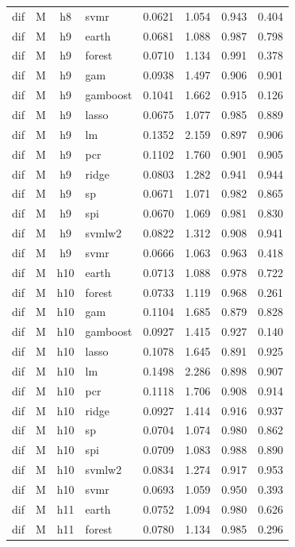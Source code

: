 \begin{ThreePartTable}
\begin{longtable}[t]{llclcccc}
dif & M & h8 & svmr & 0.0621 & 1.054 & 0.943 & 0.404\\
\addlinespace
dif & M & h9 & earth & 0.0681 & 1.088 & 0.987 & 0.798\\
dif & M & h9 & forest & 0.0710 & 1.134 & 0.991 & 0.378\\
dif & M & h9 & gam & 0.0938 & 1.497 & 0.906 & 0.901\\
dif & M & h9 & gamboost & 0.1041 & 1.662 & 0.915 & 0.126\\
dif & M & h9 & lasso & 0.0675 & 1.077 & 0.985 & 0.889\\
dif & M & h9 & lm & 0.1352 & 2.159 & 0.897 & 0.906\\
dif & M & h9 & pcr & 0.1102 & 1.760 & 0.901 & 0.905\\
dif & M & h9 & ridge & 0.0803 & 1.282 & 0.941 & 0.944\\
dif & M & h9 & sp & 0.0671 & 1.071 & 0.982 & 0.865\\
dif & M & h9 & spi & 0.0670 & 1.069 & 0.981 & 0.830\\
dif & M & h9 & svmlw2 & 0.0822 & 1.312 & 0.908 & 0.941\\
dif & M & h9 & svmr & 0.0666 & 1.063 & 0.963 & 0.418\\
\addlinespace
dif & M & h10 & earth & 0.0713 & 1.088 & 0.978 & 0.722\\
dif & M & h10 & forest & 0.0733 & 1.119 & 0.968 & 0.261\\
dif & M & h10 & gam & 0.1104 & 1.685 & 0.879 & 0.828\\
dif & M & h10 & gamboost & 0.0927 & 1.415 & 0.927 & 0.140\\
dif & M & h10 & lasso & 0.1078 & 1.645 & 0.891 & 0.925\\
dif & M & h10 & lm & 0.1498 & 2.286 & 0.898 & 0.907\\
dif & M & h10 & pcr & 0.1118 & 1.706 & 0.908 & 0.914\\
dif & M & h10 & ridge & 0.0927 & 1.414 & 0.916 & 0.937\\
dif & M & h10 & sp & 0.0704 & 1.074 & 0.980 & 0.862\\
dif & M & h10 & spi & 0.0709 & 1.083 & 0.988 & 0.890\\
dif & M & h10 & svmlw2 & 0.0834 & 1.274 & 0.917 & 0.953\\
dif & M & h10 & svmr & 0.0693 & 1.059 & 0.950 & 0.393\\
\addlinespace
dif & M & h11 & earth & 0.0752 & 1.094 & 0.980 & 0.626\\
dif & M & h11 & forest & 0.0780 & 1.134 & 0.985 & 0.296\\

\end{longtable}
\end{ThreePartTable}
